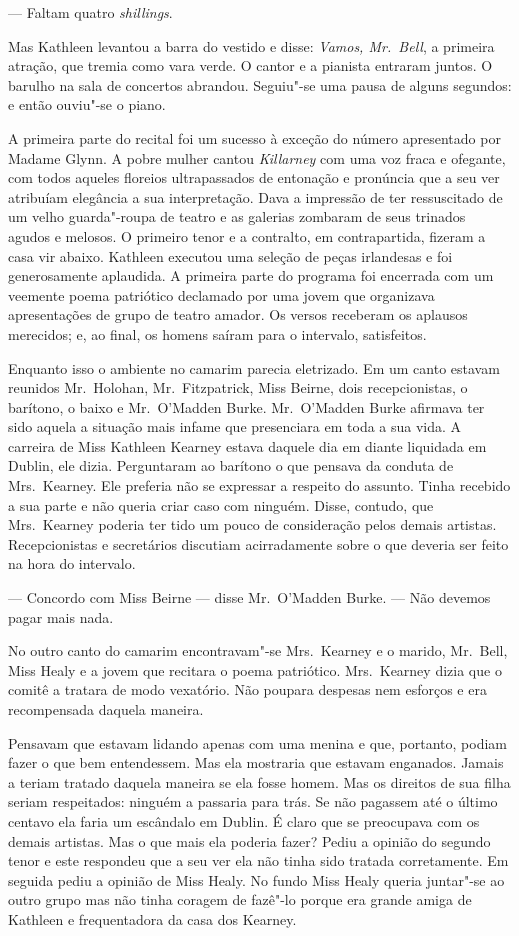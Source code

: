 --- Faltam quatro \textit{shillings}.

Mas Kathleen levantou a barra do vestido e disse: \textit{Vamos, Mr.~Bell}, a
primeira atração, que tremia como vara verde.  O cantor e a pianista entraram
juntos.  O barulho na sala de concertos abrandou.  Seguiu"-se uma pausa de
alguns segundos: e então ouviu"-se o piano.

A primeira parte do recital foi um sucesso à exceção do número apresentado por
Madame Glynn.  A pobre mulher cantou \textit{Killarney} com uma voz fraca e
ofegante, com todos aqueles floreios ultrapassados de entonação e pronúncia que
a seu ver atribuíam elegância a sua interpretação.  Dava a impressão de ter
ressuscitado de um velho guarda"-roupa de teatro e as galerias zombaram de seus
trinados agudos e melosos.  O primeiro tenor e a contralto, em contrapartida,
fizeram a casa vir abaixo.  Kathleen executou uma seleção de peças irlandesas e
foi generosamente aplaudida.  A primeira parte do programa foi encerrada com um
veemente poema patriótico declamado por uma jovem que organizava apresentações
de grupo de teatro amador.  Os versos receberam os aplausos merecidos; e, ao
final, os homens saíram para o intervalo, satisfeitos.

Enquanto isso o ambiente no camarim parecia eletrizado.  Em um canto estavam
reunidos Mr.~Holohan, Mr.~Fitzpatrick, Miss Beirne, dois recepcionistas, o
barítono, o baixo e Mr.~O’Madden Burke.  Mr.~O’Madden Burke afirmava ter sido
aquela a situação mais infame que presenciara em toda a sua vida.  A carreira
de Miss Kathleen Kearney estava daquele dia em diante liquidada em Dublin, ele
dizia.  Perguntaram ao barítono o que pensava da conduta de Mrs.~Kearney.  Ele
preferia não se expressar a respeito do assunto.  Tinha recebido a sua parte e
não queria criar caso com ninguém.  Disse, contudo, que Mrs.~Kearney poderia
ter tido um pouco de consideração pelos demais artistas.  Recepcionistas e
secretários discutiam acirradamente sobre o que deveria ser feito na hora do
intervalo.

--- Concordo com Miss Beirne --- disse Mr.~O’Madden Burke.  --- Não devemos
pagar mais nada.

No outro canto do camarim encontravam"-se Mrs.~Kearney e o marido, Mr.~Bell,
Miss Healy e a jovem que recitara o poema patriótico.  Mrs.~Kearney dizia que
o comitê a tratara de modo vexatório.  Não poupara despesas nem esforços e era
recompensada daquela maneira.  

Pensavam que estavam lidando apenas com uma menina e que, portanto, podiam
fazer o que bem entendessem.  Mas ela mostraria que estavam enganados.  Jamais
a teriam tratado daquela maneira se ela fosse homem.  Mas os direitos de sua
filha seriam respeitados: ninguém a passaria para trás.  Se não pagassem até o
último centavo ela faria um escândalo em Dublin.  É claro que se preocupava com
os demais artistas.  Mas o que mais ela poderia fazer?  Pediu a opinião do
segundo tenor e este respondeu que a seu ver ela não tinha sido tratada
corretamente.  Em seguida pediu a opinião de Miss Healy.  No fundo Miss Healy
queria juntar"-se ao outro grupo mas não tinha coragem de fazê"-lo porque era
grande amiga de Kathleen e frequentadora da casa dos Kearney.

